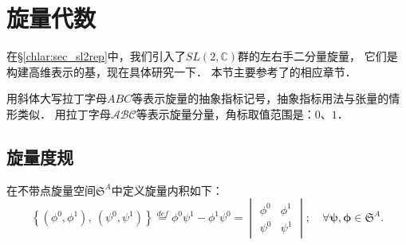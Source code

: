 \section{旋量代数}
在\S\ref{chlar:sec_sl2rep}中，我们引入了$SL(2,\mathbb{C})$群的左右手二分量旋量，
它们是构建高维表示的基，现在具体研究一下．
本节主要参考了\parencite{penrose-Rindler1984}的相应章节．

用斜体大写拉丁字母$ABC$等表示旋量的抽象指标记号，抽象指标用法与张量的情形类似．
用拉丁字母$\mathcal{A}\mathcal{B}\mathcal{C}$等表示旋量分量，角标取值范围是：$0$、$1$．



\subsection{旋量度规}

在不带点旋量空间$\mathfrak{S}^A$中定义{\heiti 旋量内积}如下：
\begin{equation} \label{chlar:eqn_S-inner}
\left\{(\phi^0,\phi^1) ,\ (\psi^0,\psi^1)\right\}\overset{def}{=}   \phi^0 \psi^1 - \phi^1 \psi^0
=\begin{vmatrix} \phi^0 & \phi^1 \\ \psi^0 & \psi^1 \end{vmatrix};
\quad \forall\boldsymbol{\psi} , \boldsymbol{\phi} \in \mathfrak{S}^A.
\end{equation}

